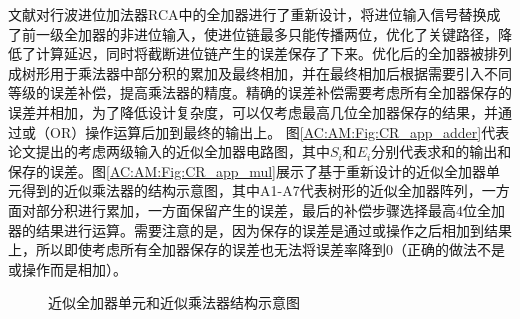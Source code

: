 文献\cite{AC:AM:CR}对行波进位加法器RCA中的全加器进行了重新设计，将进位输入信号替换成了前一级全加器的非进位输入，使进位链最多只能传播两位，优化了关键路径，降低了计算延迟，同时将截断进位链产生的误差保存了下来。优化后的全加器被排列成树形用于乘法器中部分积的累加及最终相加，并在最终相加后根据需要引入不同等级的误差补偿，提高乘法器的精度。精确的误差补偿需要考虑所有全加器保存的误差并相加，为了降低设计复杂度，可以仅考虑最高几位全加器保存的结果，并通过或（OR）操作运算后加到最终的输出上。
图\ref{AC:AM:Fig:CR_app_adder}代表论文提出的考虑两级输入的近似全加器电路图，其中$S_i$和$E_i$分别代表求和的输出和保存的误差。图\ref{AC:AM:Fig:CR_app_mul}展示了基于重新设计的近似全加器单元得到的近似乘法器的结构示意图，其中A1-A7代表树形的近似全加器阵列，一方面对部分积进行累加，一方面保留产生的误差，最后的补偿步骤选择最高4位全加器的结果进行运算。需要注意的是，因为保存的误差是通过或操作之后相加到结果上，所以即使考虑所有全加器保存的误差也无法将误差率降到0（正确的做法不是或操作而是相加）。
\begin{figure}[!htb]
    \centering
\caption{近似全加器单元和近似乘法器结构示意图}
\end{figure}


